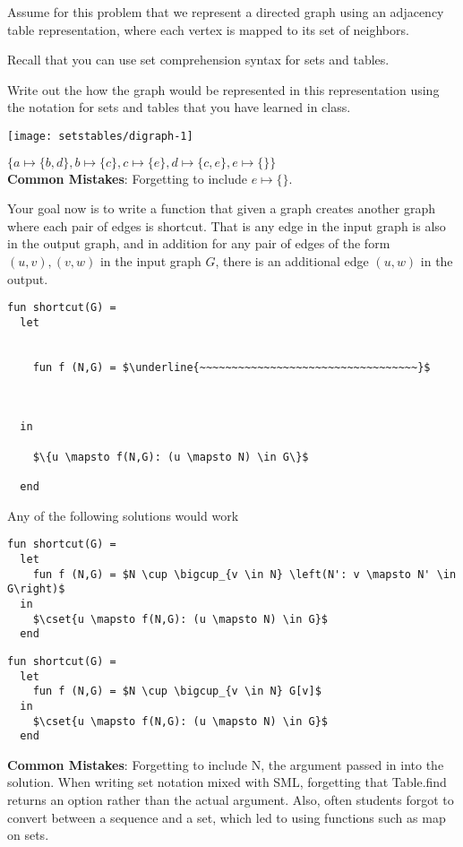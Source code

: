 \begin{problem}

Assume for this problem that we represent a directed graph using an
adjacency table representation, where each vertex is mapped to its set
of neighbors. 

Recall that you can use set comprehension syntax for sets and tables.

\ask[5]
Write out the how the graph would be represented in this
representation using the notation for sets and tables that you have
learned in class.

\begin{center}
\texttt{[image: setstables/digraph-1]}
\end{center}

\sol
$\{a \mapsto \{b,d\}, b \mapsto \{c\}, c \mapsto \{e\}, d \mapsto \{c,e\}, e \mapsto \{\} \}$ \\

\notes
\textbf{Common Mistakes}: Forgetting to include $e \mapsto \{\}$. 


\ask[12]
Your goal now is to write a function that given a graph creates
another graph where each pair of edges is shortcut.  That is any edge
in the input graph is also in the output graph, and in addition for
any pair of edges of the form $(u,v),(v,w)$ in the input graph $G$,
there is an additional edge $(u,w)$ in the output.

\begin{lstlisting}[numbers=none]
fun shortcut(G) = 
  let 


    fun f (N,G) = $\underline{~~~~~~~~~~~~~~~~~~~~~~~~~~~~~~~~~~}$



  in   

    $\{u \mapsto f(N,G): (u \mapsto N) \in G\}$

  end

\end{lstlisting}

\sol
Any of the following solutions would work 
\begin{lstlisting}[numbers=none]
fun shortcut(G) = 
  let 
    fun f (N,G) = $N \cup \bigcup_{v \in N} \left(N': v \mapsto N' \in G\right)$
  in   
    $\cset{u \mapsto f(N,G): (u \mapsto N) \in G}$
  end
\end{lstlisting}

\begin{lstlisting}[numbers=none]
fun shortcut(G) = 
  let 
    fun f (N,G) = $N \cup \bigcup_{v \in N} G[v]$
  in   
    $\cset{u \mapsto f(N,G): (u \mapsto N) \in G}$
  end
\end{lstlisting}

\notes
\textbf{Common Mistakes}: Forgetting to include N, the argument passed in into the solution. When writing set notation mixed with SML, forgetting that Table.find returns an option rather than the actual argument. Also, often students forgot to convert between a sequence and a set, which led to using functions such as map on sets.

\end{problem}



